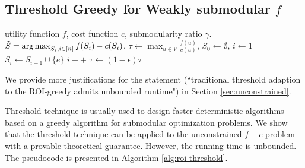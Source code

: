 \documentclass[10pt]{article} %
\DeclareMathOperator*{\argmax}{arg\,max}
\theoremstyle{remark}
\newcommand{\OPT}{{\rm OPT}}
\begin{document}







\subsection{Threshold Greedy for Weakly submodular $f$}
\label{sec:modified-thresh}
\begin{algorithm}[tb]
   \caption{\textsc{threshold-ROI}($f, c, \gamma$)}
   \label{alg:roi-threshold}
\begin{algorithmic}[1]
    utility function $f$, cost function $c$, submodularity ratio $\gamma$.
    $\Tilde{S} = \argmax_{S_i, i \in [n]} f(S_i)-c(S_i)$.
   \vspace{.05in}
   \STATE $\tau \gets \max_{u \in V}\frac{f(u)}{c(u)}$, $S_0 \gets \emptyset$, $i \gets 1$
    \WHILE{$\tau > \gamma$}
    \STATE $S_i \gets S_{i-1} \cup \{e\}$
    \STATE $i++$
    \ENDIF
    \ENDFOR
    \STATE $\tau \gets (1-\epsilon) \tau$
    \ENDWHILE
\end{algorithmic}
\end{algorithm}

We provide more justifications for the statement (``traditional threshold adaption to the ROI-greedy admits unbounded runtime") in Section \ref{sec:unconstrained}. 

Threshold technique \cite{badanidiyuru2014fast} is usually used to design faster deterministic algorithms based on a greedy algorithm for submodular optimization problems. We show that the threshold technique can be applied to the unconstrained $f-c$ problem with a provable theoretical guarantee. However, the running time is unbounded. The pseudocode is presented in Algorithm \ref{alg:roi-threshold}.
\end{document}
